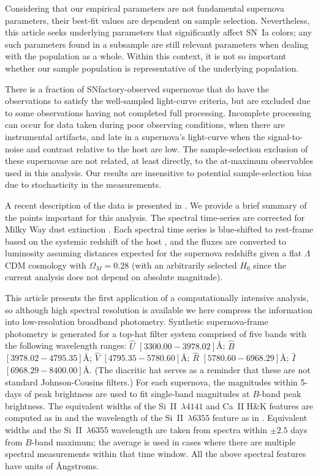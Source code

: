 \documentclass[trackchanges]{aastex62}   	%
\begin{document}
{Considering that our empirical parameters
are not fundamental supernova parameters, their best-fit values are dependent on sample selection.
Nevertheless, this  article seeks
underlying parameters that significantly
affect SN~Ia colors; any such parameters found in a subsample are still
relevant parameters when dealing with the population as a whole.
Within this context, it is not so important whether our sample population is representative
of the underlying population.

There is a fraction of SNfactory-observed supernovae that do have the
observations to satisfy the well-sampled light-curve criteria, but are excluded due to some observations
having not completed full processing.  Incomplete processing can occur for data taken during poor
observing conditions, when there are instrumental artifacts, and late in a supernova's
light-curve when the signal-to-noise and contrast relative to the host are low.  The sample-selection exclusion of these supernovae are not related,
at least directly, to the at-maximum observables used in this analysis.  Our results are insensitive to potential sample-selection
bias due to stochasticity in the measurements.
}


A recent description of the data is presented in \citet{2015ApJ...815...58F}.
We provide a brief summary of the points important for this analysis.
The spectral time-series  are corrected for Milky Way dust
extinction \citep{1989ApJ...345..245C,1998ApJ...500..525S}.  
Each spectral time series is
blue-shifted to rest-frame
based on the systemic redshift of the host \citep[c.f.][]{2013ApJ...770..107C}, and the fluxes are converted to luminosity assuming
distances expected for the supernova redshifts given a flat
$\Lambda$CDM cosmology with $\Omega_M = 0.28$ (with an arbitrarily selected
$H_0$ since the current analysis does not depend on absolute magnitude).

This article presents the first application of a computationally intensive analysis, so although  high spectral resolution
is available we here compress the information into low-resolution broadband photometry. 
Synthetic supernova-frame photometry is generated for a top-hat filter system
comprised of five 
bands with the following wavelength ranges: ${\hat{U}}$ $[3300.00 - 3978.02]$\AA;
${\hat{B}}$ $[3978.02-4795.35]$\AA;
$\hat{V}$ $[4795.35-5780.60]$\AA;
$\hat{R}$ $[5780.60-6968.29]$\AA;
$\hat{I}$ $[6968.29-8400.00]$\AA.
(The diacritic hat serves as a reminder that these are not standard Johnson-Cousins filters.)
For each supernova, the magnitudes within 5-days of peak brightness are used to fit single-band magnitudes
at $B$-band peak brightness.
The equivalent widths of the Si~II~$\lambda 4141$ and Ca~II H\&K features are computed as
in \citet{2008A&A...477..717B} and the 
wavelength of the Si~II~$\lambda 6355$ feature
as in \citet{chotard:thesis, 2017Chotard}.
Equivalent widths and the
Si~II~$\lambda 6355$ wavelength are taken from spectra  within $\pm 2.5$ days from $B$-band maximum;
the average is used  in cases where there are multiple spectral measurements within that time window.
All the above spectral features have units of \AA ngstroms.
\end{document}

